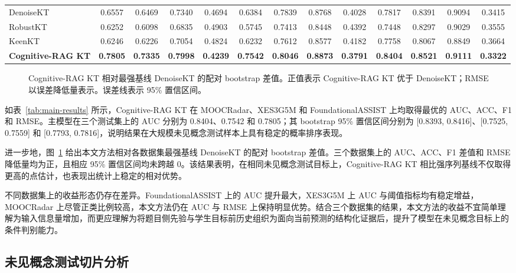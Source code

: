 \documentclass[UTF8,a4paper,12pt]{ctexart}
\numberwithin{table}{section}
\begin{document}
\begin{landscape}
\begin{table}[p]
{\begin{tabular}{lcccccccccccc}
DenoiseKT & 0.6557 & 0.6469 & 0.7340 & 0.4694 & 0.6384 & 0.7839 & 0.8768 & 0.4028 & 0.7817 & 0.8391 & 0.9094 & 0.3415 \\
RobustKT & 0.6252 & 0.6098 & 0.6835 & 0.4903 & 0.5745 & 0.7413 & 0.8448 & 0.4392 & 0.7448 & 0.8297 & 0.9029 & 0.3555 \\
KeenKT & 0.6246 & 0.6226 & 0.7054 & 0.4824 & 0.6232 & 0.7612 & 0.8577 & 0.4182 & 0.7758 & 0.8067 & 0.8849 & 0.3664 \\
\textbf{Cognitive-RAG KT} & \textbf{0.7805} & \textbf{0.7335} & \textbf{0.7998} & \textbf{0.4239} & \textbf{0.7542} & \textbf{0.8046} & \textbf{0.8873} & \textbf{0.3791} & \textbf{0.8404} & \textbf{0.8521} & \textbf{0.9111} & \textbf{0.3322} \\
\bottomrule
\end{tabular}%
}
\end{table}
\end{landscape}

\begin{figure}[H]
\centering

\caption{Cognitive-RAG KT 相对最强基线 DenoiseKT 的配对 bootstrap 差值。正值表示 Cognitive-RAG KT 优于 DenoiseKT；RMSE 以误差降低量表示。误差线表示 95\% 置信区间。}
\label{fig:paired-bootstrap-deltas}
\end{figure}

如表~\ref{tab:main-results} 所示，Cognitive-RAG KT 在 MOOCRadar、XES3G5M 和 FoundationalASSIST 上均取得最优的 AUC、ACC、F1 和 RMSE。主模型在三个测试集上的 AUC 分别为 0.8404、0.7542 和 0.7805；其 bootstrap 95\% 置信区间分别为 [0.8393, 0.8416]、[0.7525, 0.7559] 和 [0.7793, 0.7816]，说明结果在大规模未见概念测试样本上具有稳定的概率排序表现。

进一步地，图~\ref{fig:paired-bootstrap-deltas} 给出本文方法相对各数据集最强基线 DenoiseKT 的配对 bootstrap 差值。三个数据集上的 AUC、ACC、F1 差值和 RMSE 降低量均为正，且相应 95\% 置信区间均未跨越 0。该结果表明，在相同未见概念测试目标上，Cognitive-RAG KT 相比强序列基线不仅取得更高的点估计，也表现出统计上稳定的相对优势。

不同数据集上的收益形态仍存在差异。FoundationalASSIST 上的 AUC 提升最大，XES3G5M 上 AUC 与阈值指标均有稳定增益，MOOCRadar 上尽管正类比例较高，本文方法仍在 AUC 与 RMSE 上保持明显优势。结合三个数据集的结果，本文方法的收益不宜简单理解为输入信息量增加，而更应理解为将题目侧先验与学生目标前历史组织为面向当前预测的结构化证据后，提升了模型在未见概念目标上的条件判别能力。

\subsection{未见概念测试切片分析}
\end{document}
